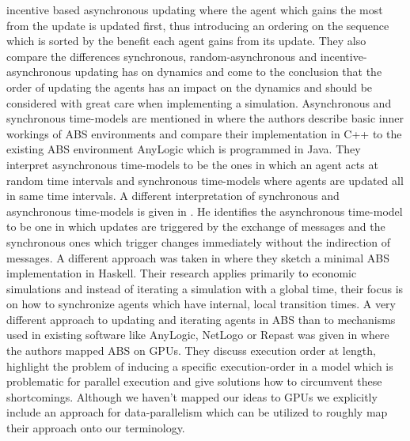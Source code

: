 incentive based asynchronous updating where the agent which gains the most from the update is updated first, thus introducing an ordering on the sequence which is sorted by the benefit each agent gains from its update. They also compare the differences synchronous, random-asynchronous and incentive-asynchronous updating has on dynamics and come to the conclusion that the order of updating the agents has an impact on the dynamics and should be considered with great care when implementing a simulation.
Asynchronous and synchronous time-models are mentioned in \cite{dawson_opening_2014} where the authors describe basic inner workings of ABS environments and compare their implementation in C++ to the existing ABS environment AnyLogic which is programmed in Java. They interpret asynchronous time-models to be the ones in which an agent acts at random time intervals and synchronous time-models where agents are updated all in same time intervals.
A different interpretation of synchronous and asynchronous time-models is given in \cite{yuxuan_agent-based_2016}. He identifies the asynchronous time-model to be one in which updates are triggered by the exchange of messages and the synchronous ones which trigger changes immediately without the indirection of messages.
A different approach was taken in \cite{botta_time_2010} where they sketch a minimal ABS implementation in Haskell. Their research applies primarily to economic simulations and instead of iterating a simulation with a global time, their focus is on how to synchronize agents which have internal, local transition times. 
A very different approach to updating and iterating agents in ABS than to mechanisms used in existing software like AnyLogic, NetLogo or Repast was given in \cite{lysenko_framework_2008} where the authors mapped ABS on GPUs. They discuss execution order at length, highlight the problem of inducing a specific execution-order in a model which is problematic for parallel execution and give solutions how to circumvent these shortcomings. Although we haven't mapped our ideas to GPUs we explicitly include an approach for data-parallelism which can be utilized to roughly map their approach onto our terminology. 
